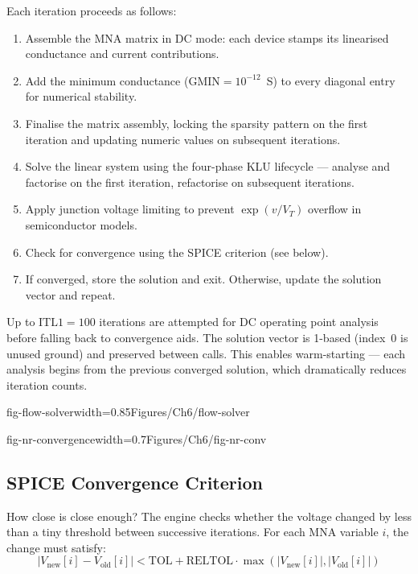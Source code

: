 Each iteration proceeds as follows:
\begin{enumerate}
  \item Assemble the MNA matrix in DC mode: each device stamps its linearised conductance and current contributions.
  \item Add the minimum conductance ($\text{GMIN} = 10^{-12}$~S) to every diagonal entry for numerical stability.
  \item Finalise the matrix assembly, locking the sparsity pattern on the first iteration and updating numeric values on subsequent iterations.
  \item Solve the linear system using the four-phase KLU lifecycle --- analyse and factorise on the first iteration, refactorise on subsequent iterations.
  \item Apply junction voltage limiting to prevent $\exp(v/V_T)$ overflow in semiconductor models.
  \item Check for convergence using the SPICE criterion (see below).
  \item If converged, store the solution and exit. Otherwise, update the solution vector and repeat.
\end{enumerate}

Up to $\text{ITL1} = 100$ iterations are attempted for DC operating point analysis before falling back to convergence aids. The solution vector is 1-based (index~0 is unused ground) and preserved between calls. This enables warm-starting --- each analysis begins from the previous converged solution, which dramatically reduces iteration counts.

  {fig-flow-solver}{width=0.85\textwidth}{Figures/Ch6/flow-solver}

  {fig-nr-convergence}{width=0.7\textwidth}{Figures/Ch6/fig-nr-conv}

\subsection{SPICE Convergence Criterion}

How close is close enough? The engine checks whether the voltage changed by less than a tiny threshold between successive iterations. For each MNA variable $i$, the change must satisfy:
\[
|V_{\text{new}}[i] - V_{\text{old}}[i]| < \text{TOL} + \text{RELTOL} \cdot \max\left(|V_{\text{new}}[i]|, |V_{\text{old}}[i]|\right)
\]

